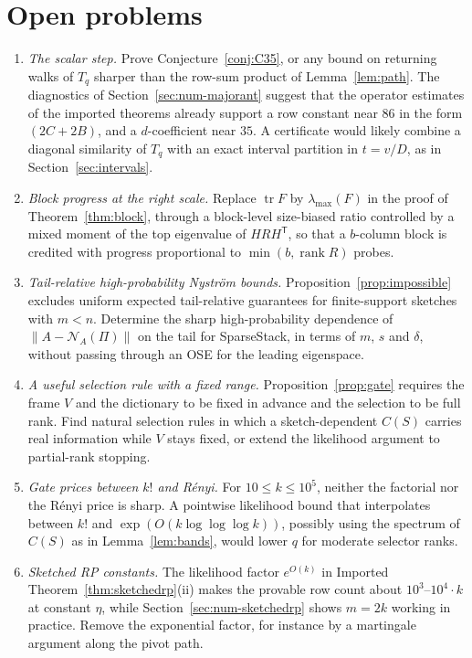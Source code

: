 \documentclass[11pt,a4paper]{article}
\theoremstyle{definition}
\theoremstyle{remark}
\newcommand{\tr}{\operatorname{tr}}
\newcommand{\rank}{\operatorname{rank}}
\newcommand{\norm}[1]{\lVert#1\rVert}
\newcommand{\Nys}{\mathcal N}
\newcommand{\1}{\mathbf 1}
\newcommand{\T}{\mathsf T}
\begin{document}
\section{Open problems}\label{sec:open}

\begin{enumerate}[leftmargin=2em,label=\arabic*.]
\item \emph{The scalar step.} Prove Conjecture~\ref{conj:C35}, or any
bound on returning walks of $T_q$ sharper than the row-sum product of
Lemma~\ref{lem:path}. The diagnostics of
Section~\ref{sec:num-majorant} suggest that the operator estimates of
the imported theorems already support a row constant near $86$ in the
form $(2C+2B)$, and a $d$-coefficient near $35$. A certificate would
likely combine a diagonal similarity of $T_q$ with an exact interval
partition in $t=v/D$, as in Section~\ref{sec:intervals}.

\item \emph{Block progress at the right scale.} Replace $\tr F$ by
$\lambda_{\max}(F)$ in the proof of Theorem~\ref{thm:block}, through a
block-level size-biased ratio controlled by a mixed moment of the top
eigenvalue of $HRH^\T$, so that a $b$-column block is credited with
progress proportional to $\min(b,\rank R)$ probes.

\item \emph{Tail-relative high-probability Nystr\"om bounds.}
Proposition~\ref{prop:impossible} excludes uniform expected
tail-relative guarantees for finite-support sketches with $m<n$.
Determine the sharp high-probability dependence of
$\norm{A-\Nys_A(\Pi)}$ on the tail for SparseStack, in terms of $m$, $s$
and $\delta$, without passing through an OSE for the leading
eigenspace.

\item \emph{A useful selection rule with a fixed range.}
Proposition~\ref{prop:gate} requires the frame $V$ and the dictionary to
be fixed in advance and the selection to be full rank. Find natural
selection rules in which a sketch-dependent $C(S)$ carries real
information while $V$ stays fixed, or extend the likelihood argument to
partial-rank stopping.

\item \emph{Gate prices between $k!$ and R\'enyi.} For $10\le k\le10^5$,
neither the factorial nor the R\'enyi price is sharp. A pointwise
likelihood bound that interpolates between $k!$ and
$\exp(O(k\log\log\log k))$, possibly using the spectrum of $C(S)$ as in
Lemma~\ref{lem:bands}, would lower $q$ for moderate selector ranks.

\item \emph{Sketched RP constants.} The likelihood factor $e^{O(k)}$ in
Imported Theorem~\ref{thm:sketchedrp}(ii) makes the provable row count about
$10^3$--$10^4\cdot k$ at constant $\eta$, while
Section~\ref{sec:num-sketchedrp} shows $m=2k$ working in practice. Remove
the exponential factor, for instance by a martingale argument along the
pivot path.
\end{enumerate}
\end{document}
